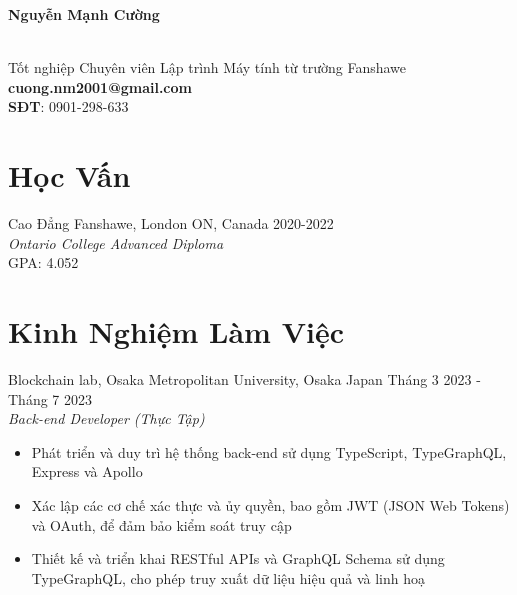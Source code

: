 \documentclass{res}
\newcommand{\inEnglish}[1]{#1}
\begin{document}
\thispagestyle{empty} %

{\bf\huge Nguyễn Mạnh Cường}

\inEnglish{
	\hfill \textbf \\ %
	Tốt nghiệp Chuyên viên Lập trình Máy tính từ trường Fanshawe
	\hfill \textbf {cuong.nm2001@gmail.com} \\
	\hfill \textbf {SĐT}: 0901-298-633 \\
}
\vspace{-15pt}

\begin{resume}
\section{Học Vấn}
\vspace{4pt}


\inEnglish{
	Cao Đẳng Fanshawe, London ON, Canada
	\hfill 2020-2022 \\
	{\sl Ontario College Advanced Diploma} \\
	 GPA: 4.052
}



\section {Kinh Nghiệm Làm Việc}

\vspace{6pt}
Blockchain lab, Osaka Metropolitan University, Osaka Japan
\hfill Tháng 3 2023 - Tháng 7 2023 \\
{\sl Back-end Developer (Thực Tập)}

\begin{itemize} \itemsep -2pt
	\item Phát triển và duy trì hệ thống back-end sử dụng TypeScript, TypeGraphQL, Express và Apollo
	\item Xác lập các cơ chế xác thực và ủy quyền, bao gồm JWT (JSON Web Tokens) và OAuth, để đảm bảo kiểm soát truy cập
	\item Thiết kế và triển khai RESTful APIs và GraphQL Schema sử dụng TypeGraphQL, cho phép truy xuất dữ liệu hiệu quả và linh hoạ

\end{itemize}


\end{resume}
\end{document}
